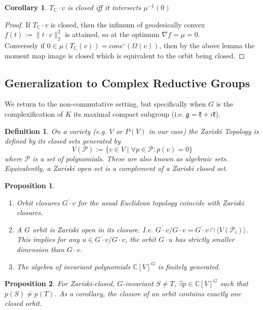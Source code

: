 \documentclass{article}
\newtheorem{corollary}{Corollary}
\newtheorem{prop}{Proposition}
\newtheorem{definition}{Definition}
\newcommand{\C}{{\mathbb{C}}}
\begin{document}
\begin{corollary}
$T_{\C} \cdot v$ is closed iff it intersects $\mu^{-1}(0)$
\end{corollary}
\begin{proof}
If $T_{\C} \cdot v$ is closed, then the infimum of geodesically convex $f(t) := \|t \cdot v\|_{2}^{2}$ is attained, so at the optimum $\nabla f = \mu = 0$. 
\\ Conversely if $0 \in \mu(T_{\C}(v)) = cone^{\circ}(\Omega(v))$, then by the above lemma the moment map image is closed which is equivalent to the orbit being closed. 
\end{proof}

\subsection{Generalization to Complex Reductive Groups}
We return to the non-commutative setting, but specifically when $G$ is the complexification of $K$ its maximal compact subgroup (i.e. $\mathfrak{g} = \mathfrak{k} + i \mathfrak{k}$). 

\begin{definition}
On a variety (e.g. $V$ or $P(V)$ in our case) the Zariski Topology is defined by its closed sets generated by
\[ V(\mathcal{P}) := \{v \in V \mid \forall p \in \mathcal{P}: p(v) = 0\}  \]
where $\mathcal{P}$ is a set of polynomials. These are also known as algebraic sets. Equivalently, a Zariski open set is a complement of a Zariski closed set. 
\end{definition}

\begin{prop}
\begin{enumerate}
    \item Orbit closures $\overline{G \cdot v}$ for the usual Euclidean topology coincide with Zariski closures. 
    \item A $G$ orbit is Zariski open in its closure. I.e. $\overline{G \cdot v}/ G \cdot v = \overline{G \cdot v} \cap \langle V(\mathcal{P}_{i}) \rangle$. This implies for any $u \in \overline{G \cdot v}/ G \cdot v$, the orbit $G \cdot u$ has strictly smaller dimension than $G \cdot v$.  
    \item The algebra of invariant polynomials $\C[V]^{G}$ is finitely generated. 
\end{enumerate}
\end{prop}

\begin{prop}
For Zariski-closed, $G$-invariant $S \neq T$, $\exists p \in \C[V]^{G}$ such that $p(S) \neq p(T)$. As a corollary, the closure of an orbit contains exactly one closed orbit. 
\end{prop}
\end{document}
